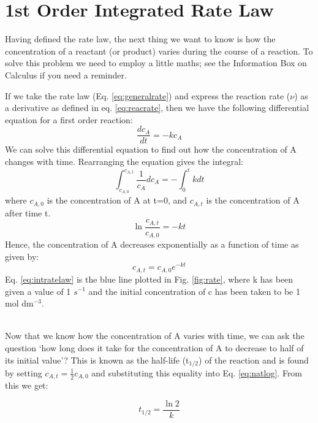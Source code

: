 \documentclass[	DIV=calc,%
							paper=a4,%
							fontsize=11pt,%
							twocolumn]{scrartcl}	 					%
\begin{document}
\section*{1st Order Integrated Rate Law}
Having defined the rate law, the next thing we want to know is how the concentration of a reactant (or product) varies during the course of a reaction. To solve this problem we need to employ a little maths; see the Information Box on Calculus if you need a reminder. 

If we take the rate law (Eq. \ref{eq:generalrate}) and express the reaction rate ($\nu$) as a derivative as defined in eq. \ref{eq:reacrate}, then we have the following differential equation for a first order reaction:
\begin{equation}
    \frac{dc_A}{dt}= -kc_A
\end{equation}
We can solve this differential equation to find out how the concentration of A changes with time. Rearranging the equation gives the integral:
\begin{equation}
    \int^{c_{A,t}}_{c_{A,0}}{\frac{1}{c_A}}dc_A = -\int_0^t k dt
\end{equation}
where $c_{A,0}$ is the concentration of A at t=0, and $c_{A,t}$ is the concentration of A after time t.
\begin{equation}
    \ln\frac{c_{A,t}}{c_{A,0}} = -kt
    \label{eq:natlog}
\end{equation}
Hence, the concentration of A decreases exponentially as a function of time as given by:
    \begin{equation}
        c_{A,t} = c_{A,0}e^{-kt}
        \label{eq:intratelaw}
    \end{equation}    
\noindent Eq. \ref{eq:intratelaw} is the blue line plotted in Fig. \ref{fig:rate}, where k has been given a value of 1 $s^{-1}$ and the initial concentration of c has been taken to be 1 mol dm$^{-3}$.

~
\\
\noindent Now that we know how the concentration of A varies with time, we can ask the question `how long does it take for the concentration of A to decrease to half of its initial value'? This is known as the half-life (t$_{1/2}$) of the reaction and is found by setting $c_{A,t} = \frac{1}{2} c_{A,0}$ and substituting this equality into Eq. \ref{eq:natlog}. From this we get:
\begin{tcolorbox}[title= Definition: First Order half-Life]
    \begin{equation}
        t_{1/2} = \frac{\ln{2}}{k}
    \end{equation}
\end{tcolorbox}
\end{document}
